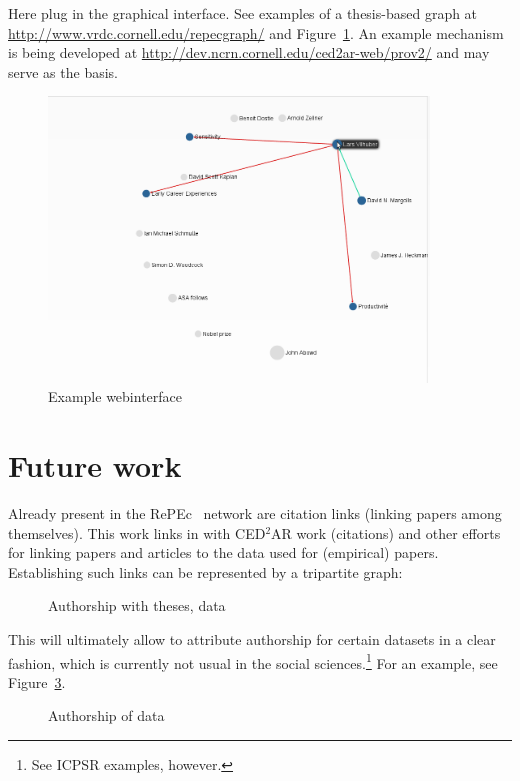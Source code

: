 \documentclass[x11names]{article}
\newcommand{\repec}{RePEc}
\begin{document}
Here plug in the graphical interface. See examples of a thesis-based graph at \url{http://www.vrdc.cornell.edu/repecgraph/} and Figure~\ref{fig:webinterface-pvi26}. An example mechanism is being developed at \url{http://dev.ncrn.cornell.edu/ced2ar-web/prov2/} and may serve as the basis.

\begin{figure}[ht]
\caption{Example webinterface}\label{fig:webinterface-pvi26}
\includegraphics[width=0.9\textwidth]{web-interface-pvi26}
\end{figure}
\clearpage

\section{Future work}
\label{sec:future_work}
Already present in the \repec~ network are citation links (linking papers among themselves). This work links in with CED$^2$AR work (citations) and other efforts for linking papers and articles to the data used for (empirical) papers. Establishing such links can be represented by a tripartite graph:

\begin{figure}[ht]
\caption{Authorship with theses, data}\label{fig:tripartite}

\end{figure}
This will ultimately allow to attribute authorship for certain datasets in a clear fashion, which is currently not usual in the social sciences.\footnote{See ICPSR examples, however.} For an example, see Figure~\ref{fig:tripartite-hilite}.

\begin{figure}[ht]
\caption{Authorship of data}\label{fig:tripartite-hilite}

\end{figure}

\printbibliography
\end{document}

